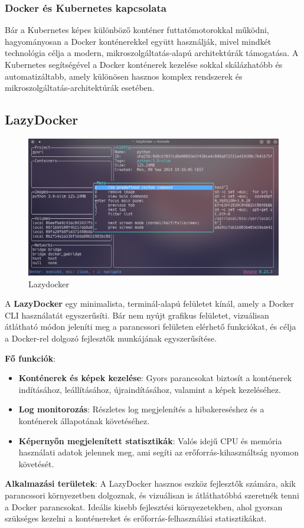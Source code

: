\subsubsection{Docker és Kubernetes kapcsolata}

Bár a Kubernetes képes különböző konténer futtatómotorokkal működni, hagyományosan a Docker konténerekkel együtt használják, mivel mindkét technológia célja a modern, mikroszolgáltatás-alapú architektúrák támogatása. A Kubernetes segítségével a Docker konténerek kezelése sokkal skálázhatóbb és automatizáltabb, amely különösen hasznos komplex rendszerek és mikroszolgáltatás-architektúrák esetében.


\subsection{LazyDocker}

\begin{figure}[H]
	\centering
	\includegraphics[width=0.7\linewidth]{images/lazydocker}
	\caption[]{Lazydocker}
	\label{fig:lazydocker}
\end{figure}

A \textbf{LazyDocker} egy minimalista, terminál-alapú felületet kínál, amely a Docker CLI használatát egyszerűsíti. Bár nem nyújt grafikus felületet, vizuálisan átlátható módon jeleníti meg a parancssori felületen elérhető funkciókat, és célja a Docker-rel dolgozó fejlesztők munkájának egyszerűsítése.



\textbf{Fő funkciók}:
\begin{itemize}
	\item \textbf{Konténerek és képek kezelése}: Gyors parancsokat biztosít a konténerek indításához, leállításához, újraindításához, valamint a képek kezeléséhez.
	\item \textbf{Log monitorozás}: Részletes log megjelenítés a hibakereséshez és a konténerek állapotának követéséhez.
	\item \textbf{Képernyőn megjelenített statisztikák}: Valós idejű CPU és memória használati adatok jelennek meg, ami segíti az erőforrás-kihasználtság nyomon követését.
\end{itemize}

\textbf{Alkalmazási területek}:
A LazyDocker hasznos eszköz fejlesztők számára, akik parancssori környezetben dolgoznak, és vizuálisan is átláthatóbbá szeretnék tenni a Docker parancsokat. Ideális kisebb fejlesztési környezetekben, ahol gyorsan szükséges kezelni a konténereket és erőforrás-felhasználási statisztikákat.



